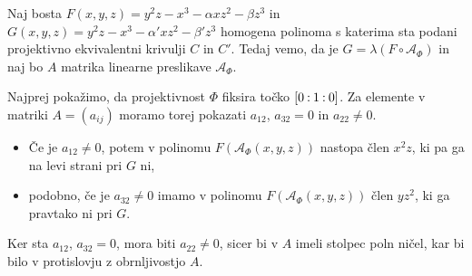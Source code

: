 \documentclass[mat1]{fmfdelo}
\newcommand{\linphi}{\mathcal{A}_\Phi}
\newcommand{\oio}{\pcoor{0: 1 : 0}}
\newcommand{\pcoor}[1]{%
  \begingroup\lccode`~=`: \lowercase{\endgroup
  \edef~}{\mathbin{\mathchar\the\mathcode`:}\nobreak}%
  [%
  \begingroup
  \mathcode`:=\string"8000
  #1%
  \endgroup
  ]%
}
\theoremstyle{definition}
\begin{document}
\begin{dokaz}
    Naj bosta $F(x,y,z) = y^2z - x^3 - \alpha xz^2 - \beta z^3$ in $G(x, y, z) = y^2z - x^3 - \alpha' xz^2 - \beta' z^3$ homogena polinoma s katerima sta podani projektivno ekvivalentni krivulji $C$ in $C'$. Tedaj vemo, da je $G = \lambda(F \circ \linphi)$ in naj bo $A$ matrika linearne preslikave $\linphi$.
    
    Najprej pokažimo, da projektivnost $\Phi$ fiksira točko $\oio$. Za elemente v matriki $A = (a_{ij})$ moramo torej pokazati $a_{12}$, $a_{32} = 0$ in $a_{22} \neq 0$. 
    \begin{itemize}
        \item Če je $a_{12} \neq 0$, potem v polinomu $F(\linphi(x,y,z))$ nastopa člen $x^2z$, ki pa ga na levi strani pri $G$ ni, 
        \item podobno, če je $a_{32} \neq 0$ imamo v polinomu $F(\linphi(x,y,z))$ člen $yz^2$, ki ga pravtako ni pri $G$. 
    \end{itemize}
    Ker sta $a_{12}$, $a_{32} = 0$, mora biti $a_{22} \neq 0$, sicer bi v $A$ imeli stolpec poln ničel, kar bi bilo v protislovju z obrnljivostjo $A$. 
    

\end{dokaz}
\end{document}

